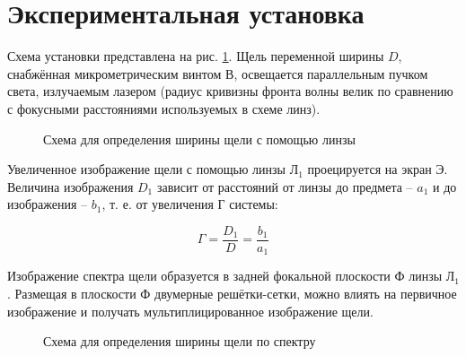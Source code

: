 \documentclass[a5paper,10pt, twoside]{article} %
\begin{document}
\section{Экспериментальная установка}

Схема установки представлена на рис. \ref{ris:ust}. Щель переменной ширины $D$, снабжённая 
микрометрическим винтом В, освещается параллельным пучком света, излучаемым
лазером (радиус кривизны фронта волны велик по сравнению с фокусными расстояниями используемых 
в схеме линз).

\begin{figure}[h]
	\caption{Схема для определения ширины щели с помощью линзы}
	\label{ris:ust}
\end{figure}

Увеличенное изображение щели с помощью линзы $\text{Л}_1$ проецируется на экран Э. Величина
изображения $D_1$ зависит от расстояний от линзы до предмета -- $a_1$ и до изображения -- $b_1$, 
т. е. от увеличения Г системы:

\begin{equation}
	\Gamma = \frac{D_1}{D} = \frac{b_1}{a_1}
\end{equation}\label{eq::zoom}

Изображение спектра щели образуется в задней фокальной плоскости Ф линзы $\text{Л}_1$. Размещая в 
плоскости Ф двумерные решётки-сетки, можно влиять на первичное изображение и получать 
мультиплицированное изображение щели.

\begin{figure}[h]
	\caption{Схема для определения ширины щели по спектру}
	\label{ris:spectrum}
\end{figure}
\end{document}

